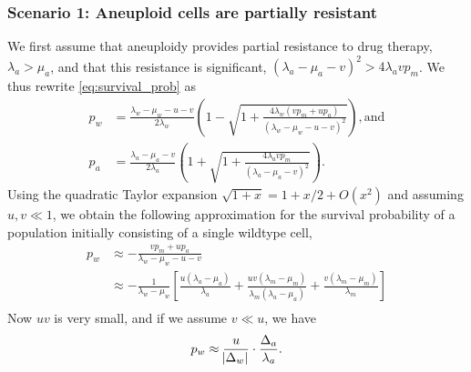 \documentclass[12pt]{extarticle}
\begin{document}
\begin{appendices}
\subsubsection*{Scenario 1: Aneuploid cells are partially resistant} 

We first assume that aneuploidy provides partial resistance to drug therapy, $\lambda_a>\mu_a$, and that this resistance is significant, $\left(\lambda_a-\mu_a-v\right)^2 > 4\lambda_a v p_m$.
We thus rewrite \cref{eq:survival_prob} as
\begin{align*}
p_w&=\frac{\lambda_w-\mu_w-u-v}{2\lambda_w}\left(1-\sqrt{1+\frac{4\lambda_w\left(vp_m+up_a\right)}{\left(\lambda_w-\mu_w-u-v\right)^2}}\right) ,
\text{and} \\
p_a&=\frac{\lambda_a-\mu_a-v}{2\lambda_a}\left(1+\sqrt{1+\frac{4\lambda_avp_m}{\left(\lambda_a-\mu_a-v\right)^2}}\right) . 
\end{align*}
Using the quadratic Taylor expansion $\sqrt{1+x}=1+x/2+O(x^2)$ and assuming $u,v \ll 1$,
we obtain the following approximation for the survival probability of a population initially consisting of a single wildtype cell,
\begin{align} \label{eq:survprobwapprox1}
p_w 
&\approx -\frac{vp_m+up_a}{\lambda_w-\mu_w-u-v}\\
\nonumber
&\approx-\frac{1}{\lambda_w-\mu_w}\left[\frac{u\left(\lambda_a-\mu_a\right)}{\lambda_a}+\frac{uv\left(\lambda_m-\mu_m\right)}{\lambda_m\left(\lambda_a-\mu_a\right)}+\frac{v\left(\lambda_m-\mu_m\right)}{\lambda_m}\right]\\
\end{align}
Now $u v$ is very small, and if we assume $v \ll u$, we have
\begin{equation}
p_w \approx \frac{u}{\abs{\Delta_w}} \cdot \frac{\Delta_a}{\lambda_a} .
\end{equation}


\end{appendices}
\end{document}
